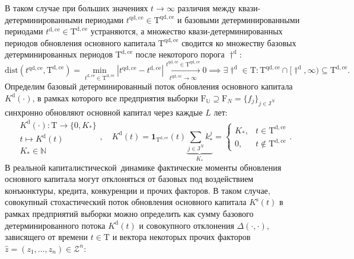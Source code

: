 В таком случае при больших значениях $t \to \infty$ различия между квази-детерминированными периодами $t^{\mathrm{qd,ce}} \in \mathrm{T}^{\mathrm{qd,ce}}$ и базовыми детерминированными периодами $t^{\mathrm{d,ce}} \in \mathrm{T}^{\mathrm{d,ce}}$ устраняются, а множество квази-детерминированных периодов обновления основного капитала $\mathrm{T}^{\mathrm{qd,ce}}$ сводится ко множеству базовых детерминированных периодов $\mathrm{T}^{\mathrm{d,ce}}$ после некоторого порога $\dagger^{\mathrm{d}}$:
\begin{equation}\mathrm{dist}(t^{\mathrm{qd,ce}}, \mathrm{T}^{\mathrm{d,ce}}) = \min_{t^{\mathrm{d,ce}} \in \mathrm{T}^{\mathrm{d,ce}}} |t^{\mathrm{qd,ce}} - t^{\mathrm{d,ce}}| \xrightarrow[t^{\mathrm{qd,ce}} \to \infty]{t^{\mathrm{qd,ce}} \in \mathrm{T}^{\mathrm{qd,ce}}}0 \implies \exists \dagger^{\mathrm{d}} \in \mathrm{T} :  \mathrm{T}^{\mathrm{qd,ce}} \cap [\dagger^{\mathrm{d}}, \infty) \subseteq \mathrm{T}^{\mathrm{d,ce}}.\end{equation}
Определим базовый детерминированный поток обновления основного капитала $K^{\mathrm{d}}(\cdot)$, в рамках которого все предприятия выборки $\mathrm{F}_{\mathbb{U}} \supseteq \mathrm F_N = \{f_j\}_{j \in \mathrm{J}^{N}}$ синхронно обновляют основной капитал через каждые $L$ лет:
\begin{equation}\begin{aligned} K^{\mathrm{d}}(\cdot) : \mathrm{T} \longrightarrow \{0, K_{*} \} \\ t \longmapsto K^{\mathrm{d}}(t) \\ K_{*} \in \mathbb{N} \end{aligned}, \quad K^{\mathrm{d}}(t) = \mathbf{1}_{\mathrm{T}^{\mathrm{d,ce}}}(t) \underbrace{\sum_{j \in \mathrm{J}^{N}} k^{j}_{*}}_{K_{*}} = \begin{cases} K_{*}, &t \in \mathrm{T}^{\mathrm{d,ce}} \\ 0, &t \not\in \mathrm{T}^{\mathrm{d,ce}} \end{cases}.\end{equation}
В реальной капиталистической динамике фактические моменты обновления основного капитала могут отклоняться от базовых под воздействием конъюнктуры, кредита, конкуренции и прочих факторов. В таком случае, совокупный стохастический поток обновления основного капитала $K^{\mathrm{s}}(t)$ в рамках предприятий выборки можно определить как сумму базового детерминированного потока $K^{\mathrm{d}}(t)$ и совокупного отклонения $\Delta (\cdot, \cdot)$, зависящего от времени $t \in \mathrm{T}$ и вектора некоторых прочих факторов $\hat{z} = (z_{1}, \dots, z_{n}) \in \mathcal{Z}^{n}$:
